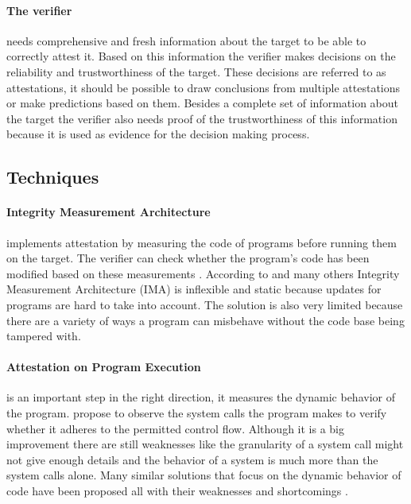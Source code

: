 \paragraph*{The verifier}
needs comprehensive and fresh information about the target to be able to correctly attest it. Based on this information the verifier makes decisions on the reliability and trustworthiness of the target. These decisions are referred to as attestations, it should be possible to draw conclusions from multiple attestations or make predictions based on them. Besides a complete set of information about the target the verifier also needs proof of the trustworthiness of this information because it is used as evidence for the decision making process. 

\subsection*{Techniques}

\paragraph*{Integrity Measurement Architecture }
implements attestation by measuring the code of programs before running them on the target. The verifier can check whether the program's code has been modified based on these measurements \cite{YuAimin2008BAti} \cite{JaegerTrent2006Ppim} \cite{DuanJialiang2020IMBo} \cite{KucabMichal2021Raai}. According to \cite{AlamMasoom2012Aoer} and many others Integrity Measurement Architecture (IMA) is inflexible and static because updates for programs are hard to take into account. The solution is also very limited because there are a variety of ways a program can misbehave without the code base being tampered with.

\paragraph*{Attestation on Program Execution}
is an important step in the right direction, it measures the dynamic behavior of the program. \cite{GuLiang2008Raop} propose to observe the system calls the program makes to verify whether it adheres to the permitted control flow. Although it is a big improvement there are still weaknesses like the granularity of a system call might not give enough details and the behavior of a system is much more than the system calls alone. Many similar solutions that focus on the dynamic behavior of code have been proposed all with their weaknesses and shortcomings \cite{QinYu2020RRIP} \cite{AliToqeer2017Daio} \cite{StelteB2010Timi} \cite{BaHaihe2017RMAf}.

